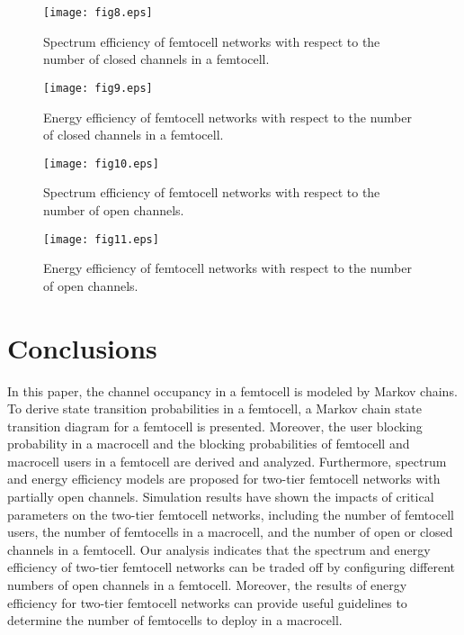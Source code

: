 \documentclass[10pt,final,journal,letterpaper,twoside,twocolumn]{IEEEtran}
\begin{document}
\begin{figure}
\vspace{0.1in}
\centerline{\texttt{[image: fig8.eps]}}
\caption{\small  Spectrum efficiency of femtocell networks with respect to
the number of closed channels in a femtocell.}
\end{figure}
\begin{figure}
\vspace{0.1in}
\centerline{\texttt{[image: fig9.eps]}}
\caption{\small  Energy efficiency of femtocell networks with respect to the
number of closed channels in a femtocell.}
\end{figure}
\begin{figure}
\vspace{0.1in}
\centerline{\texttt{[image: fig10.eps]}}
\caption{\small Spectrum efficiency of femtocell networks with respect to the
number of open channels.}
\end{figure}
\begin{figure}
\vspace{0.1in}
\centerline{\texttt{[image: fig11.eps]}}
\caption{\small  Energy efficiency of femtocell networks with respect to the
number of open channels.}
\end{figure}

\section{Conclusions}
\label{sec6}

In this paper, the channel occupancy in a femtocell is modeled by Markov chains. To derive state
transition probabilities in a femtocell, a Markov chain state transition
diagram for a femtocell is presented. Moreover, the user blocking probability
in a macrocell and the blocking probabilities of femtocell and macrocell
users in a femtocell are derived and analyzed. Furthermore, spectrum and energy efficiency models are proposed for
two-tier femtocell networks with partially open channels. Simulation results have shown the impacts
of critical parameters on the two-tier femtocell networks, including the number of femtocell users, the number
of femtocells in a macrocell, and the number of open or closed channels in a
femtocell. Our analysis indicates that the spectrum and energy efficiency of two-tier femtocell networks can be traded off by configuring different numbers of open channels in a femtocell. Moreover, the results of energy efficiency for two-tier femtocell networks can provide useful guidelines to determine the number of femtocells to deploy in a macrocell.
\end{document}
